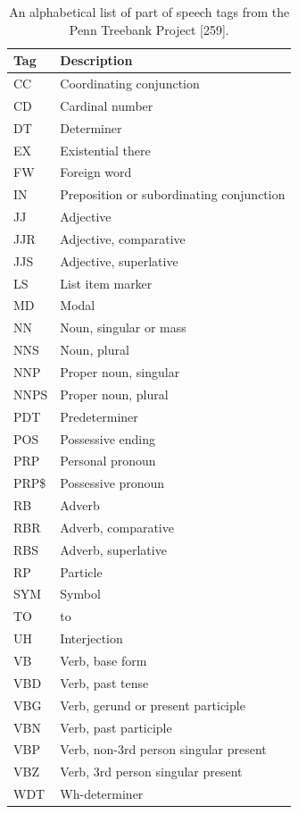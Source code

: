 \documentclass[11pt,openany,executivepaper]{book}
\begin{document}
\begin{table}[htbp]
\tiny
\setlength{\tabcolsep}{3pt}
\renewcommand{\arraystretch}{1}
\begin{center}
\caption{An alphabetical list of part of speech tags from the Penn Treebank Project [259].}
\begin{tabular}{l|l}
\hline
Tag & Description \\
\hline
CC & Coordinating conjunction \\
CD & Cardinal number \\
DT & Determiner \\
EX & Existential there \\
FW & Foreign word \\
IN & Preposition or subordinating conjunction \\
JJ & Adjective \\
JJR & Adjective, comparative \\
JJS & Adjective, superlative \\
LS & List item marker \\
MD & Modal \\
NN & Noun, singular or mass \\
NNS & Noun, plural \\
NNP & Proper noun, singular \\
NNPS & Proper noun, plural \\
PDT & Predeterminer \\
POS & Possessive ending \\
PRP & Personal pronoun \\
PRP\$ & Possessive pronoun \\
RB & Adverb \\
RBR & Adverb, comparative \\
RBS & Adverb, superlative \\
RP & Particle \\
SYM & Symbol \\
TO & to \\
UH & Interjection \\
VB & Verb, base form \\
VBD & Verb, past tense \\
VBG & Verb, gerund or present participle \\
VBN & Verb, past participle \\
VBP & Verb, non-3rd person singular present \\
VBZ & Verb, 3rd person singular present \\
WDT & Wh-determiner \\

\end{tabular}
\end{center}
\end{table}
\end{document}
